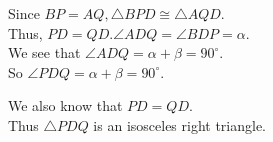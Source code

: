 \documentclass{article}
\begin{document}
Since \(B P=A Q, \triangle B P D \cong \triangle A Q D\).\\
Thus, \(P D=Q D . \angle A D Q=\angle B D P=\alpha\).\\
We see that \(\angle A D Q=\alpha+\beta=90^{\circ}\).\\
So \(\angle P D Q=\alpha+\beta=90^{\circ}\).

We also know that \(P D=Q D\).\\
Thus \(\triangle P D Q\) is an isosceles right triangle.
\end{document}
